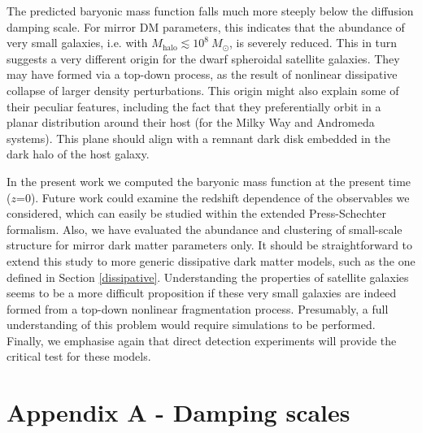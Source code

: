 \documentclass[12pt]{article}
\begin{document}
The predicted baryonic mass function  falls much more steeply below the diffusion damping scale. For mirror DM parameters, this indicates 
that the abundance of very small galaxies, i.e. with $M_{\text{halo}} \lesssim 10^8 \ M_\odot$, is severely reduced. This in turn 
suggests a very different origin for the dwarf spheroidal satellite galaxies. They may have formed via a top-down process, as 
the result of nonlinear dissipative collapse of larger density perturbations. This origin might also explain some of their 
peculiar features, including the fact that they preferentially orbit in a planar distribution around their host (for the Milky Way and 
Andromeda systems). This plane should align with a remnant dark disk embedded in the dark halo of the host galaxy.

In the present work we computed the baryonic mass function at the present time ($z$=$0$).
Future work could examine the redshift dependence of the observables we considered, which can 
easily be studied within the extended Press-Schechter formalism. Also, we have evaluated the abundance and 
clustering of small-scale structure for mirror dark matter parameters only. It should be straightforward to extend this study to 
more generic dissipative dark matter models, such as the one defined in Section \ref{dissipative}.
Understanding the properties of satellite galaxies seems to be a more difficult proposition if these very small galaxies are 
indeed formed from a top-down nonlinear fragmentation process. Presumably, 
a full understanding of this problem would require simulations to be performed. Finally, we emphasise again that 
direct detection experiments will provide the critical test for these models.


\section*{Appendix A - Damping scales}
\end{document}
